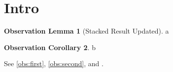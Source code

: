 \documentclass[twocolumn,unicode]{wrapper}
\begin{document}
\wrapperclass\articleclass\layoutmode\hypermode
\theoremstyle{definition}
\swapnumbers
\newtheorem{oblemma}{Observation Lemma}[section]
\newtheorem{obcor}[oblemma]{Observation Corollary}
\section{Intro}
\begin{oblemma}[Stacked Result Updated]\label{obs:first}
a
\end{oblemma}
\begin{obcor}\label{obs:second}
b
\end{obcor}
See \autoref{obs:first}, \autoref{obs:second}, and .
\end{document}
